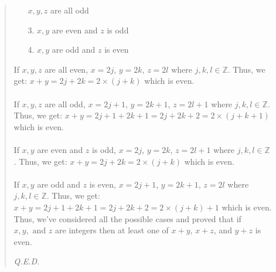 \documentclass[12pt, a4paper]{article}                      %
\newcommand{\intz}{\mathbb{Z}}
\begin{document}
\begin{itemize}
\begin{quote}
\begin{itemize}
$x,y,z$ are all odd
\item[3.]
$x,y$ are even and $z$ is odd
\item[4.]
$x,y$ are odd and $z$ is even
\end{itemize}
If $x,y,z$ are all even, $x = 2j$, $y = 2k$, $z = 2l$ where $j,k,l \in \intz$. Thus, we get:
$x + y = 2j + 2k = 2 \times (j + k)$ which is even.
\\\\
If $x,y,z$ are all odd, $x = 2j + 1$, $y = 2k + 1$, $z = 2l + 1$ where $j,k,l \in \intz$. Thus, we get:
$x + y = 2j + 1 + 2k + 1 = 2j + 2k + 2 = 2 \times (j + k + 1)$ which is even.
\\\\
If $x,y$ are even and $z$ is odd, $x = 2j$, $y = 2k$, $z = 2l + 1$ where $j,k,l \in \intz$. Thus, we get:
$x + y = 2j + 2k = 2 \times (j + k)$ which is even.
\\\\
If $x,y$ are odd and $z$ is even, $x = 2j + 1$, $y = 2k + 1$, $z = 2l$ where $j,k,l \in \intz$. Thus, we get:
$x + y = 2j + 1 + 2k + 1 = 2j + 2k + 2 = 2 \times (j + k) + 1$ which is even.
\\
Thus, we've considered all the possible cases and proved that if $x, y, \mbox{ and } z$ are integers then at
least one of $x + y$, $x + z$, and $y + z$ is even.
\begin{flushright}
\textit{Q.E.D.}
\end{flushright}
\end{quote}


\end{itemize}
\end{document}
